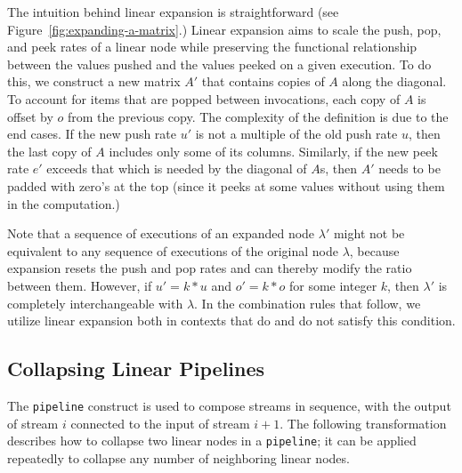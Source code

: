 The intuition behind linear expansion is straightforward (see
Figure~\ref{fig:expanding-a-matrix}.)  Linear expansion aims to scale
the push, pop, and peek rates of a linear node while preserving the
functional relationship between the values pushed and the values
peeked on a given execution.  To do this, we construct a new matrix
$A'$ that contains copies of $A$ along the diagonal.  To account for
items that are popped between invocations, each copy of $A$ is offset
by $o$ from the previous copy.  The complexity of the definition is
due to the end cases.  If the new push rate $u'$ is not a multiple of
the old push rate $u$, then the last copy of $A$ includes only some of
its columns.  Similarly, if the new peek rate $e'$ exceeds that which
is needed by the diagonal of $A$s, then $A'$ needs to be padded with
zero's at the top (since it peeks at some values without using them in
the computation.)

Note that a sequence of executions of an expanded node $\lambda'$
might not be equivalent to any sequence of executions of the original
node $\lambda$, because expansion resets the push and pop rates and
can thereby modify the ratio between them.  However, if $u' = k * u$
and $o' = k * o$ for some integer $k$, then $\lambda'$ is completely
interchangeable with $\lambda$.  In the combination rules that follow,
we utilize linear expansion both in contexts that do and do not
satisfy this condition.

\subsection{Collapsing Linear Pipelines}


The {\tt pipeline} construct is used to compose streams in sequence,
with the output of stream $i$ connected to the input of stream $i+1$.
The following transformation describes how to collapse two linear
nodes in a {\tt pipeline}; it can be applied repeatedly to collapse
any number of neighboring linear nodes.

